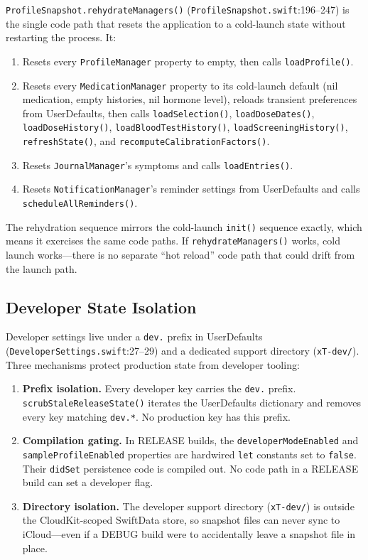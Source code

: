 \documentclass[11pt,a4paper]{article}
\newcommand{\code}[1]{\texttt{\small #1}}
\begin{document}
\code{ProfileSnapshot.rehydrateManagers()} (\code{ProfileSnapshot.swift}:196--247)
is the single code path that resets the application to a cold-launch state
without restarting the process. It:

\begin{enumerate}[nosep,leftmargin=1.4em]
\item Resets every \code{ProfileManager} property to empty, then calls
  \code{loadProfile()}.
\item Resets every \code{MedicationManager} property to its cold-launch
  default (nil medication, empty histories, nil hormone level), reloads
  transient preferences from UserDefaults, then calls
  \code{loadSelection()}, \code{loadDoseDates()},
  \code{loadDoseHistory()}, \code{loadBloodTestHistory()},
  \code{loadScreeningHistory()}, \code{refreshState()}, and
  \code{recomputeCalibrationFactors()}.
\item Resets \code{JournalManager}'s symptoms and calls
  \code{loadEntries()}.
\item Resets \code{NotificationManager}'s reminder settings from
  UserDefaults and calls \code{scheduleAllReminders()}.
\end{enumerate}

The rehydration sequence mirrors the cold-launch \code{init()} sequence
exactly, which means it exercises the same code paths. If
\code{rehydrateManagers()} works, cold launch works---there is no separate
``hot reload'' code path that could drift from the launch path.

\subsection{Developer State Isolation}
\label{sec:dev_isolation}

Developer settings live under a \code{dev.} prefix in UserDefaults
(\code{DeveloperSettings.swift}:27--29) and a dedicated support directory
(\verb|xT-dev/|). Three mechanisms protect production state from developer
tooling:

\begin{enumerate}[nosep,leftmargin=1.4em]
\item \textbf{Prefix isolation.} Every developer key carries the \code{dev.}
  prefix. \code{scrubStaleReleaseState()} iterates the UserDefaults
  dictionary and removes every key matching \code{dev.*}. No production key
  has this prefix.
\item \textbf{Compilation gating.} In RELEASE builds, the
  \code{developerModeEnabled} and \code{sampleProfileEnabled} properties are
  hardwired \code{let} constants set to \code{false}. Their \code{didSet}
  persistence code is compiled out. No code path in a RELEASE build can set
  a developer flag.
\item \textbf{Directory isolation.} The developer support directory
  (\verb|xT-dev/|) is outside the CloudKit-scoped SwiftData store, so
  snapshot files can never sync to iCloud---even if a DEBUG build were to
  accidentally leave a snapshot file in place.
\end{enumerate}
\end{document}
